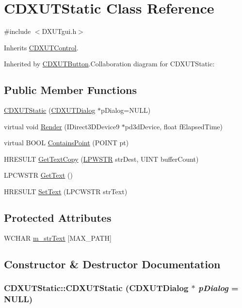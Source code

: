 \hypertarget{class_c_d_x_u_t_static}{
\section{CDXUTStatic Class Reference}
\label{class_c_d_x_u_t_static}
}


{\ttfamily \#include $<$DXUTgui.h$>$}

Inherits \hyperlink{class_c_d_x_u_t_control}{CDXUTControl}.

Inherited by \hyperlink{class_c_d_x_u_t_button}{CDXUTButton}.Collaboration diagram for CDXUTStatic:\subsection*{Public Member Functions}
\begin{DoxyCompactItemize}
\item 
\hyperlink{class_c_d_x_u_t_static_ac0533bb16db426e6a3f4e180f0a18fc4}{CDXUTStatic} (\hyperlink{class_c_d_x_u_t_dialog}{CDXUTDialog} $\ast$pDialog=NULL)
\item 
virtual void \hyperlink{class_c_d_x_u_t_static_a7237fbf3accc077c35c2dd79b9bd2e3e}{Render} (IDirect3DDevice9 $\ast$pd3dDevice, float fElapsedTime)
\item 
virtual BOOL \hyperlink{class_c_d_x_u_t_static_ae32024764670a1f5b1ad0ba4a8570d63}{ContainsPoint} (POINT pt)
\item 
HRESULT \hyperlink{class_c_d_x_u_t_static_a8e72da05ab9718c59f1c667289950c5d}{GetTextCopy} (\hyperlink{_d_x_u_tgui_8cpp_a6ad64a19933213d15128e5fcd09bc1a6}{LPWSTR} strDest, UINT bufferCount)
\item 
LPCWSTR \hyperlink{class_c_d_x_u_t_static_a3da09900b41866941215aacc9da64803}{GetText} ()
\item 
HRESULT \hyperlink{class_c_d_x_u_t_static_ac5dd2c6b2a9da5eeb57ad377286ac568}{SetText} (LPCWSTR strText)
\end{DoxyCompactItemize}
\subsection*{Protected Attributes}
\begin{DoxyCompactItemize}
\item 
WCHAR \hyperlink{class_c_d_x_u_t_static_a196a0036e5d50df0986db5537c9e05d4}{m\_\-strText} \mbox{[}MAX\_\-PATH\mbox{]}
\end{DoxyCompactItemize}


\subsection{Constructor \& Destructor Documentation}
\hypertarget{class_c_d_x_u_t_static_ac0533bb16db426e6a3f4e180f0a18fc4}{
\subsubsection[{CDXUTStatic}]{\setlength{\rightskip}{0pt plus 5cm}CDXUTStatic::CDXUTStatic ({\bf CDXUTDialog} $\ast$ {\em pDialog} = {\ttfamily NULL})}}
\label{class_c_d_x_u_t_static_ac0533bb16db426e6a3f4e180f0a18fc4}


